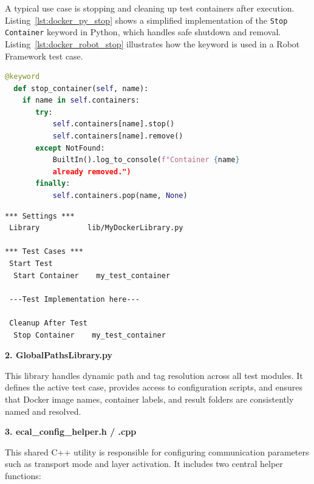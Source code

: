 \vspace{0.5em}
A typical use case is stopping and cleaning up test containers after execution. Listing~\ref{lst:docker_py_stop} shows a simplified implementation of the \texttt{Stop Container} keyword in Python, which handles safe shutdown and removal. Listing~\ref{lst:docker_robot_stop} illustrates how the keyword is used in a Robot Framework test case.

\begin{lstlisting}[style=cppstyle, language=Python, caption={Example keyword implementation in \texttt{MyDockerLibrary.py}}, label={lst:docker_py_stop}, captionpos=b]
 @keyword
  def stop_container(self, name):
    if name in self.containers:
       try:
           self.containers[name].stop()
           self.containers[name].remove()
       except NotFound:
           BuiltIn().log_to_console(f"Container {name} 
           already removed.")
       finally:
           self.containers.pop(name, None)
\end{lstlisting}

\begin{lstlisting}[style=cppstyle, caption={Calling \texttt{Stop Container} in a Robot Framework test}, label={lst:docker_robot_stop}, captionpos=b]
*** Settings ***
 Library           lib/MyDockerLibrary.py	

*** Test Cases ***
 Start Test
  Start Container    my_test_container
  
 ---Test Implementation here---  
 
 Cleanup After Test
  Stop Container    my_test_container
\end{lstlisting}


\vspace{1em}
\textbf{2. GlobalPathsLibrary.py}

\vspace{0.3em}
This library handles dynamic path and tag resolution across all test modules. It defines the active test case, provides access to configuration scripts, and ensures that Docker image names, container labels, and result folders are consistently named and resolved.

\vspace{1em}
\textbf{3. ecal\_config\_helper.h / .cpp}

\vspace{0.3em}
This shared C++ utility is responsible for configuring communication parameters such as transport mode and layer activation. It includes two central helper functions:

